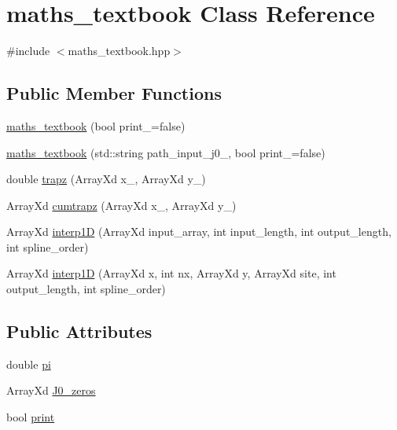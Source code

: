 \hypertarget{classmaths__textbook}{}\section{maths\+\_\+textbook Class Reference}
\label{classmaths__textbook}


{\ttfamily \#include $<$maths\+\_\+textbook.\+hpp$>$}

\subsection*{Public Member Functions}
\begin{DoxyCompactItemize}
\item 
\hyperlink{classmaths__textbook_a5a7c7fedbd125f32ce35deb6664a19d9}{maths\+\_\+textbook} (bool print\+\_\+=false)
\item 
\hyperlink{classmaths__textbook_a56743163bbb37c83a95d8cb1ca1cc35b}{maths\+\_\+textbook} (std\+::string path\+\_\+input\+\_\+j0\+\_\+, bool print\+\_\+=false)
\item 
double \hyperlink{classmaths__textbook_a158ce9c89ee1db5495810c25ee2aed57}{trapz} (Array\+Xd x\+\_\+, Array\+Xd y\+\_\+)
\item 
Array\+Xd \hyperlink{classmaths__textbook_ae893700d202ab9a84e33974f9ca42da3}{cumtrapz} (Array\+Xd x\+\_\+, Array\+Xd y\+\_\+)
\item 
Array\+Xd \hyperlink{classmaths__textbook_a803caea252953788b96a898a3bab9bd0}{interp1D} (Array\+Xd input\+\_\+array, int input\+\_\+length, int output\+\_\+length, int spline\+\_\+order)
\item 
Array\+Xd \hyperlink{classmaths__textbook_ac4789e1e67a597303faab6cc5fa889ec}{interp1D} (Array\+Xd x, int nx, Array\+Xd y, Array\+Xd site, int output\+\_\+length, int spline\+\_\+order)
\end{DoxyCompactItemize}
\subsection*{Public Attributes}
\begin{DoxyCompactItemize}
\item 
double \hyperlink{classmaths__textbook_a96b811ef2a81ca51b98cf2a10c8ac5bc}{pi}
\item 
Array\+Xd \hyperlink{classmaths__textbook_a41398eada5e3eb88fb64d044c14aed26}{J0\+\_\+zeros}
\item 
bool \hyperlink{classmaths__textbook_ae2a8fbebf9b44587f2d21df219c10812}{print}
\end{DoxyCompactItemize}
